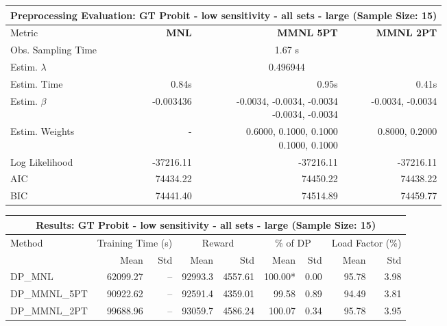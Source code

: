 
\begin{samepage}
\begin{center}
  \small
  \begin{tabular}{l|r|r|r}
    \toprule
    \multicolumn{4}{c}{\textbf{Preprocessing Evaluation: GT Probit - low sensitivity - all sets - large (Sample Size: 15)}} \\
    \midrule
    Metric & \textbf{MNL} & \textbf{MMNL 5PT} & \textbf{MMNL 2PT} \\
    \midrule
    Obs. Sampling Time & \multicolumn{3}{c}{1.67 s} \\
    Estim. $\lambda$ & \multicolumn{3}{c}{0.496944} \\
    Estim. Time & 0.84s & 0.95s & 0.41s \\
    Estim. $\beta$ & -0.003436 & \makecell[tr]{-0.0034, -0.0034, -0.0034 \\ -0.0034, -0.0034} & -0.0034, -0.0034 \\
    Estim. Weights & - & \makecell[tr]{0.6000, 0.1000, 0.1000 \\ 0.1000, 0.1000} & 0.8000, 0.2000 \\
    Log Likelihood & -37216.11 & -37216.11 & -37216.11 \\
    AIC & 74434.22 & 74450.22 & 74438.22 \\
    BIC & 74441.40 & 74514.89 & 74459.77 \\
    \bottomrule
  \end{tabular}
\end{center}
\begin{center}
  \small
  \begin{tabular}{l|rr|rr|rr|rr}
    \toprule
    \multicolumn{9}{c}{\textbf{Results: GT Probit - low sensitivity - all sets - large (Sample Size: 15)}} \\
    \midrule
    Method & \multicolumn{2}{c|}{Training Time (s)} & \multicolumn{2}{c|}{Reward} & \multicolumn{2}{c|}{\% of DP} & \multicolumn{2}{c}{Load Factor (\%)} \\
    & Mean & Std & Mean & Std & Mean & Std & Mean & Std \\
    \midrule
    DP\_MNL      & 62099.27 &    -- &    92993.3 &    4557.61 & 100.00* &    0.00 &   95.78 &    3.98 \\
    DP\_MMNL\_5PT & 90922.62 &    -- &    92591.4 &    4359.01 &   99.58 &    0.89 &   94.49 &    3.81 \\
    DP\_MMNL\_2PT & 99688.96 &    -- &    93059.7 &    4586.24 &  100.07 &    0.34 &   95.78 &    3.95 \\

\end{tabular}
\end{center}
\end{samepage}
